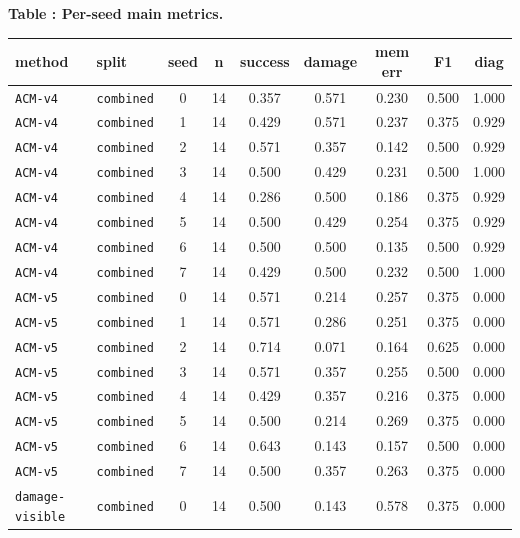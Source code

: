 \documentclass{article}
\begin{document}
\tiny
\setlength{\tabcolsep}{2pt}
\begin{center}
\label{tab:seed-main}\textbf{Table \thetable: Per-seed main metrics.}\\[0.4ex]
\begin{tabular}{llccccccc}
\toprule
method & split & seed & n & success & damage & mem err & F1 & diag \\
\midrule
\texttt{ACM-v4} & \texttt{combined} & 0 & 14 & 0.357 & 0.571 & 0.230 & 0.500 & 1.000 \\
\texttt{ACM-v4} & \texttt{combined} & 1 & 14 & 0.429 & 0.571 & 0.237 & 0.375 & 0.929 \\
\texttt{ACM-v4} & \texttt{combined} & 2 & 14 & 0.571 & 0.357 & 0.142 & 0.500 & 0.929 \\
\texttt{ACM-v4} & \texttt{combined} & 3 & 14 & 0.500 & 0.429 & 0.231 & 0.500 & 1.000 \\
\texttt{ACM-v4} & \texttt{combined} & 4 & 14 & 0.286 & 0.500 & 0.186 & 0.375 & 0.929 \\
\texttt{ACM-v4} & \texttt{combined} & 5 & 14 & 0.500 & 0.429 & 0.254 & 0.375 & 0.929 \\
\texttt{ACM-v4} & \texttt{combined} & 6 & 14 & 0.500 & 0.500 & 0.135 & 0.500 & 0.929 \\
\texttt{ACM-v4} & \texttt{combined} & 7 & 14 & 0.429 & 0.500 & 0.232 & 0.500 & 1.000 \\
\texttt{ACM-v5} & \texttt{combined} & 0 & 14 & 0.571 & 0.214 & 0.257 & 0.375 & 0.000 \\
\texttt{ACM-v5} & \texttt{combined} & 1 & 14 & 0.571 & 0.286 & 0.251 & 0.375 & 0.000 \\
\texttt{ACM-v5} & \texttt{combined} & 2 & 14 & 0.714 & 0.071 & 0.164 & 0.625 & 0.000 \\
\texttt{ACM-v5} & \texttt{combined} & 3 & 14 & 0.571 & 0.357 & 0.255 & 0.500 & 0.000 \\
\texttt{ACM-v5} & \texttt{combined} & 4 & 14 & 0.429 & 0.357 & 0.216 & 0.375 & 0.000 \\
\texttt{ACM-v5} & \texttt{combined} & 5 & 14 & 0.500 & 0.214 & 0.269 & 0.375 & 0.000 \\
\texttt{ACM-v5} & \texttt{combined} & 6 & 14 & 0.643 & 0.143 & 0.157 & 0.500 & 0.000 \\
\texttt{ACM-v5} & \texttt{combined} & 7 & 14 & 0.500 & 0.357 & 0.263 & 0.375 & 0.000 \\
\texttt{damage-visible} & \texttt{combined} & 0 & 14 & 0.500 & 0.143 & 0.578 & 0.375 & 0.000 \\

\end{tabular}
\end{center}
\end{document}

